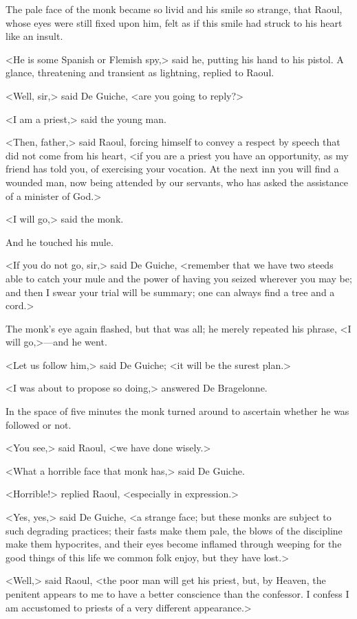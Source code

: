 The pale face of the monk became so livid and his smile so strange, that Raoul, whose eyes were still fixed upon him, felt as if this smile had struck to his heart like an insult.

<He is some Spanish or Flemish spy,> said he, putting his hand to his pistol. A glance, threatening and transient as lightning, replied to Raoul.

<Well, sir,> said De Guiche, <are you going to reply?>

<I am a priest,> said the young man.

<Then, father,> said Raoul, forcing himself to convey a respect by speech that did not come from his heart, <if you are a priest you have an opportunity, as my friend has told you, of exercising your vocation. At the next inn you will find a wounded man, now being attended by our servants, who has asked the assistance of a minister of God.>

<I will go,> said the monk.

And he touched his mule.

<If you do not go, sir,> said De Guiche, <remember that we have two steeds able to catch your mule and the power of having you seized wherever you may be; and then I swear your trial will be summary; one can always find a tree and a cord.>

The monk's eye again flashed, but that was all; he merely repeated his phrase, <I will go,>—and he went.

<Let us follow him,> said De Guiche; <it will be the surest plan.>

<I was about to propose so doing,> answered De Bragelonne.

In the space of five minutes the monk turned around to ascertain whether he was followed or not.

<You see,> said Raoul, <we have done wisely.>

<What a horrible face that monk has,> said De Guiche.

<Horrible!> replied Raoul, <especially in expression.>

<Yes, yes,> said De Guiche, <a strange face; but these monks are subject to such degrading practices; their fasts make them pale, the blows of the discipline make them hypocrites, and their eyes become inflamed through weeping for the good things of this life we common folk enjoy, but they have lost.>

<Well,> said Raoul, <the poor man will get his priest, but, by Heaven, the penitent appears to me to have a better conscience than the confessor. I confess I am accustomed to priests of a very different appearance.>

